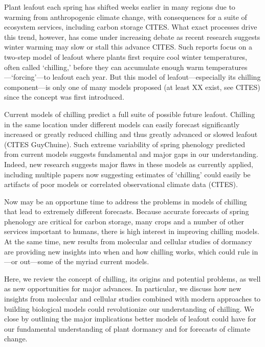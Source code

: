 \documentclass[11pt]{article}
\begin{document}

\renewcommand{\refname}{\CHead{}}

Plant leafout each spring has shifted weeks earlier in many regions due to warming from anthropogenic climate change, with consequences for a suite of ecosystem services, including carbon storage CITES.  What exact processes drive this trend, however, has come under increasing debate as recent research suggests winter warming may slow or stall this advance CITES. Such reports focus on a two-step model of leafout where plants first require cool winter temperatures, often called `chilling,' before they can accumulate enough warm temperatures---`forcing'---to leafout each year. But this model of leafout---especially its chilling component---is only one of many models proposed (at least XX exist, see CITES) since the concept was first introduced. 

Current models of chilling predict a full suite of possible future leafout. Chilling in the same location under different models can easily forecast significantly increased or greatly reduced chilling and thus greatly advanced or slowed leafout (CITES GuyChuine). Such extreme variability of spring phenology predicted from current models suggests fundamental and major gaps in our understanding. Indeed, new research suggests major flaws in these models as currently applied, including multiple papers now suggesting estimates of `chilling' could easily be artifacts of poor models or correlated observational climate data (CITES). 

Now may be an opportune time to address the problems in models of chilling that lead to extremely different forecasts. Because accurate forecasts of spring phenology are critical for carbon storage, many crops and a number of other services important to humans, there is high interest in improving chilling models. At the same time, new results from molecular and cellular studies of dormancy are providing new insights into when and how chilling works, which could rule in---or out---some of the myriad current models. 

Here, we review the concept of chilling, its origins and potential problems, as well as new opportunities for major advances. In particular, we discuss how new insights from molecular and cellular studies combined with modern approaches to building biological models could revolutionize our understanding of chilling. We close by outlining the major implications better models of leafout could have for our fundamental understanding of plant dormancy and for forecasts of climate change. 
\end{document}
